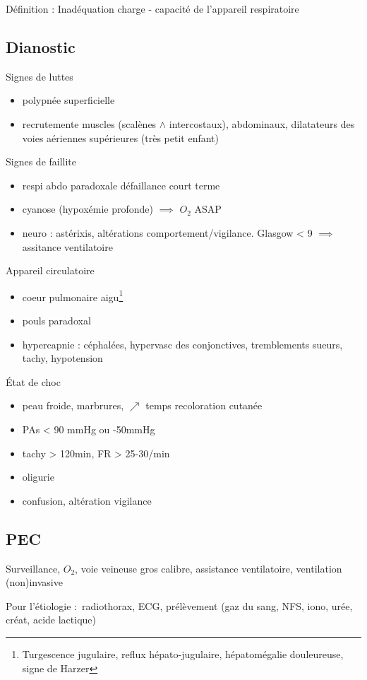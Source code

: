 \documentclass{article}
\begin{document}
Définition : Inadéquation charge - capacité de l'appareil respiratoire

\subsection{Dianostic}
Signes de luttes
\begin{itemize}
\item polypnée superficielle
\item recrutemente muscles (scalènes $\wedge$ intercostaux), abdominaux,
  dilatateurs des voies aériennes supérieures (très petit enfant)
\end{itemize}
Signes de faillite
\begin{itemize}
\item respi abdo paradoxale \skull{} défaillance court terme
\item cyanose (hypoxémie profonde) $\implies$ $O_2$ ASAP
\item neuro : astérixis, altérations comportement/vigilance. Glasgow < 9
  $\implies$ assitance ventilatoire
\end{itemize}
Appareil circulatoire
\begin{itemize}
\item coeur pulmonaire aigu\footnote{Turgescence jugulaire, reflux
    hépato-jugulaire, hépatomégalie douleureuse, signe de Harzer}
\item pouls paradoxal
\item hypercapnie : {céphalées, hypervasc des conjonctives}, {tremblements
    sueurs, tachy, hypotension}
\end{itemize}
État de choc 
\begin{itemize}
\item peau froide, marbrures, $\nearrow$ temps recoloration cutanée
\item PAs < 90 mmHg ou -50mmHg
\item tachy > 120min, FR > 25-30/min
\item oligurie
\item confusion, altération vigilance
\end{itemize}

\subsection{PEC}
Surveillance, $O_2$, voie veineuse gros calibre, assistance ventilatoire,
ventilation (non)invasive

Pour l'étiologie : radiothorax, ECG, prélèvement (gaz du sang, NFS, iono, urée,
créat, acide lactique)
\end{document}
